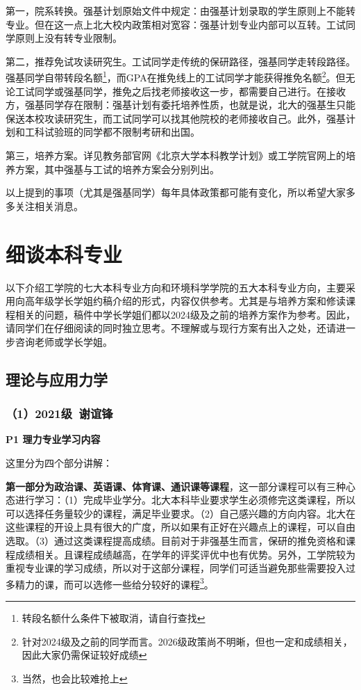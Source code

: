 \documentclass[11pt,oneside]{book}
\begin{document}
第一，院系转换。强基计划原始文件中规定：由强基计划录取的学生原则上不能转专业。但在这一点上北大校内政策相对宽容：强基计划专业内部可以互转。工试同学原则上没有转专业限制。

\vspace{10pt}

第二，推荐免试攻读研究生。工试同学走传统的保研路径，强基同学走转段路径。强基同学自带转段名额\footnote{转段名额什么条件下被取消，请自行查找}，而GPA在推免线上的工试同学才能获得推免名额\footnote{针对2024级及之前的同学而言。2026级政策尚不明晰，但也一定和成绩相关，因此大家仍需保证较好成绩}。但无论工试同学或强基同学，推免之后找老师接收这一步，都需要自己进行。在接收方，强基同学存在限制：强基计划有委托培养性质，也就是说，北大的强基生只能保送本校攻读研究生，而工试同学可以找其他院校的老师接收自己。此外，强基计划和工科试验班的同学都不限制考研和出国。

\vspace{10pt}

第三，培养方案。详见教务部官网《北京大学本科教学计划》或工学院官网上的培养方案，其中强基与工试的培养方案会分别列出。

\vspace{10pt}

以上提到的事项（尤其是强基同学）每年具体政策都可能有变化，所以希望大家多多关注相关消息。

\section{细谈本科专业}
以下介绍工学院的七大本科专业方向和环境科学学院的五大本科专业方向，主要采用向高年级学长学姐约稿介绍的形式，内容仅供参考。尤其是与培养方案和修读课程相关的问题，稿件中学长学姐们都以2024级及之前的培养方案作为参考。因此，请同学们在仔细阅读的同时独立思考。不理解或与现行方案有出入之处，还请进一步咨询老师或学长学姐。
\subsection{理论与应用力学}
\subsubsection{（1）2021级\ 谢谊锋}
\textbf{P1 理力专业学习内容}

这里分为四个部分讲解：

\vspace{10pt}

\textbf{第一部分为政治课、英语课、体育课、通识课等课程}，这一部分课程可以有三种心态进行学习：（1）完成毕业学分。北大本科毕业要求学生必须修完这类课程，所以可以选择任务量较少的课程，满足毕业要求。（2）自己感兴趣的方向内容。北大在这些课程的开设上具有很大的广度，所以如果有正好在兴趣点上的课程，可以自由选取。（3）通过这类课程提高成绩。目前对于非强基生而言，保研的推免资格和课程成绩相关。且课程成绩越高，在学年的评奖评优中也有优势。另外，工学院较为重视专业课的学习成绩，所以对于这部分课程，同学们可适当避免那些需要投入过多精力的课，而可以选修一些给分较好的课程\footnote{当然，也会比较难抢上}。
\end{document}
